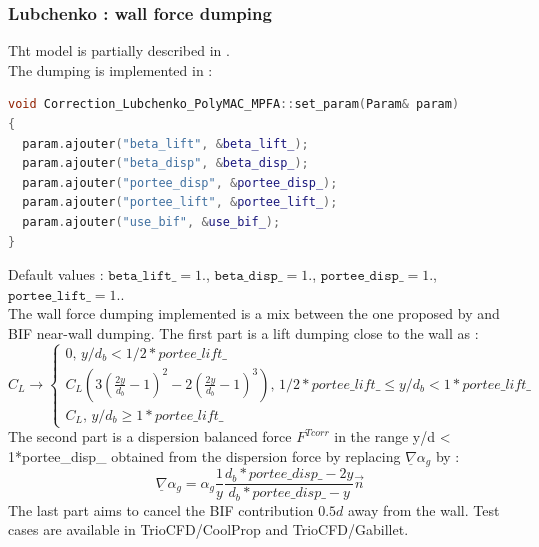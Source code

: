 \subsubsection{Lubchenko : wall force dumping}
Tht model is partially described in \cite{LUBCHENKO201836}.\\
The dumping is implemented in :
\begin{lstlisting}[language=c++]
void Correction_Lubchenko_PolyMAC_MPFA::set_param(Param& param)
{
  param.ajouter("beta_lift", &beta_lift_);
  param.ajouter("beta_disp", &beta_disp_);
  param.ajouter("portee_disp", &portee_disp_);
  param.ajouter("portee_lift", &portee_lift_);
  param.ajouter("use_bif", &use_bif_);
}
\end{lstlisting}
Default values :   $\texttt{beta\_lift\_} =  1. $, $\texttt{beta\_disp\_}=  1. $, $\texttt{portee\_disp\_}= 1.$, $\texttt{portee\_lift\_}= 1.$.\\
The wall force dumping implemented is a mix between the one proposed by \cite{Lubchenko2018} and BIF near-wall dumping.
The first part is a lift dumping close to the wall as :
\begin{equation}
	C_L \rightarrow \begin{cases} 0 \text{,~} y/d_b<1/2*portee\_lift\_  \\
	C_L\left(3\left(\frac{2y}{d_b}-1\right)^2-2\left(\frac{2y}{d_b}-1\right)^3\right) \text{,~} 1/2*portee\_lift\_ \leq y/d_b < 1*portee\_lift\_ \\
	C_L \text{,~} y/d_b\geq 1*portee\_lift\_ \end{cases}
\end{equation}
The second part is a dispersion balanced force $F^{Tcorr}$ in the range y/d < 1*portee\_disp\_  obtained from the dispersion force by replacing $\underline{\nabla}\alpha_g$ by :
\begin{equation}
	 \underline{\nabla}\alpha_g = \alpha_g\frac{1}{y}\frac{d_b*portee\_disp\_-2y}{d_b*portee\_disp\_-y}\overrightarrow{n}
\end{equation}
The last part aims to cancel the BIF contribution $0.5d$ away from the wall.
Test cases are available in TrioCFD/CoolProp and TrioCFD/Gabillet.

